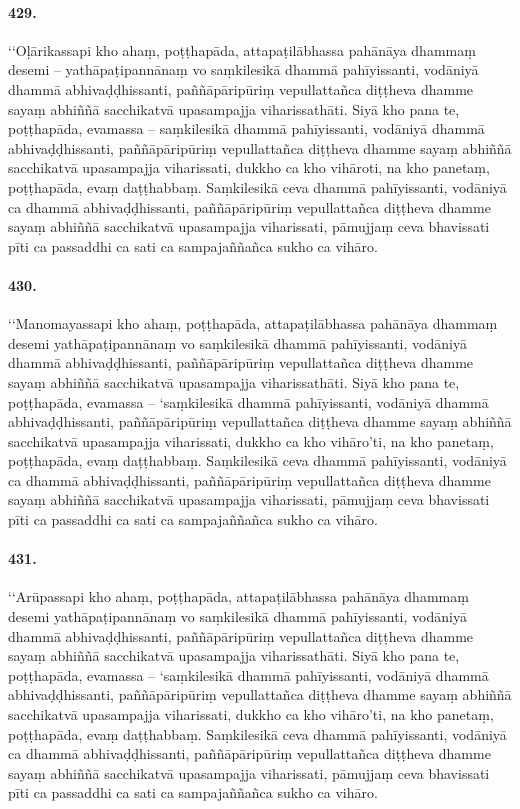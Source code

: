 \paragraph{429.} ‘‘Oḷārikassapi kho ahaṃ, poṭṭhapāda, attapaṭilābhassa pahānāya dhammaṃ desemi – yathāpaṭipannānaṃ vo saṃkilesikā dhammā pahīyissanti, vodāniyā dhammā abhivaḍḍhissanti, paññāpāripūriṃ vepullattañca diṭṭheva dhamme sayaṃ abhiññā sacchikatvā upasampajja viharissathāti. Siyā kho pana te, poṭṭhapāda, evamassa – saṃkilesikā dhammā pahīyissanti, vodāniyā dhammā abhivaḍḍhissanti, paññāpāripūriṃ vepullattañca diṭṭheva dhamme sayaṃ abhiññā sacchikatvā upasampajja viharissati, dukkho ca kho vihāroti, na kho panetaṃ, poṭṭhapāda, evaṃ daṭṭhabbaṃ. Saṃkilesikā ceva dhammā pahīyissanti, vodāniyā ca dhammā abhivaḍḍhissanti, paññāpāripūriṃ vepullattañca diṭṭheva dhamme sayaṃ abhiññā sacchikatvā upasampajja viharissati, pāmujjaṃ ceva bhavissati pīti ca passaddhi ca sati ca sampajaññañca sukho ca vihāro.

\paragraph{430.} ‘‘Manomayassapi kho ahaṃ, poṭṭhapāda, attapaṭilābhassa pahānāya dhammaṃ desemi yathāpaṭipannānaṃ vo saṃkilesikā dhammā pahīyissanti, vodāniyā dhammā abhivaḍḍhissanti, paññāpāripūriṃ vepullattañca diṭṭheva dhamme sayaṃ abhiññā sacchikatvā upasampajja viharissathāti. Siyā kho pana te, poṭṭhapāda, evamassa – ‘saṃkilesikā dhammā pahīyissanti, vodāniyā dhammā abhivaḍḍhissanti, paññāpāripūriṃ vepullattañca diṭṭheva dhamme sayaṃ abhiññā sacchikatvā upasampajja viharissati, dukkho ca kho vihāro’ti, na kho panetaṃ, poṭṭhapāda, evaṃ daṭṭhabbaṃ. Saṃkilesikā ceva dhammā pahīyissanti, vodāniyā ca dhammā abhivaḍḍhissanti, paññāpāripūriṃ vepullattañca diṭṭheva dhamme sayaṃ abhiññā sacchikatvā upasampajja viharissati, pāmujjaṃ ceva bhavissati pīti ca passaddhi ca sati ca sampajaññañca sukho ca vihāro.

\paragraph{431.} ‘‘Arūpassapi kho ahaṃ, poṭṭhapāda, attapaṭilābhassa pahānāya dhammaṃ desemi yathāpaṭipannānaṃ vo saṃkilesikā dhammā pahīyissanti, vodāniyā dhammā abhivaḍḍhissanti, paññāpāripūriṃ vepullattañca diṭṭheva dhamme sayaṃ abhiññā sacchikatvā upasampajja viharissathāti. Siyā kho pana te, poṭṭhapāda, evamassa – ‘saṃkilesikā dhammā pahīyissanti, vodāniyā dhammā abhivaḍḍhissanti, paññāpāripūriṃ vepullattañca diṭṭheva dhamme sayaṃ abhiññā sacchikatvā upasampajja viharissati, dukkho ca kho vihāro’ti, na kho panetaṃ, poṭṭhapāda, evaṃ daṭṭhabbaṃ. Saṃkilesikā ceva dhammā pahīyissanti, vodāniyā ca dhammā abhivaḍḍhissanti, paññāpāripūriṃ vepullattañca diṭṭheva dhamme sayaṃ abhiññā sacchikatvā upasampajja viharissati, pāmujjaṃ ceva bhavissati pīti ca passaddhi ca sati ca sampajaññañca sukho ca vihāro.

